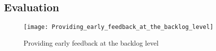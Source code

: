 \subsection{Evaluation}\label{redundancy_evaluation}


\begin{figure}[h]
\center
\texttt{[image: Providing\_early\_feedback\_at\_the\_backlog\_level]}
\caption{Providing early feedback at the backlog level \cite{mosser2022modelling}}\label{fig:early_feedback}
\end{figure}


 
%
